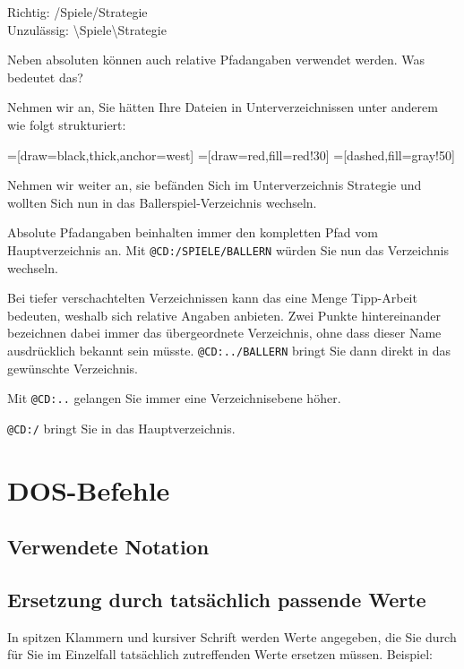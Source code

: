 \documentclass[10pt,a4paper]{scrartcl}		%
\begin{document}
Richtig: /Spiele/Strategie\\
Unzulässig: \textbackslash Spiele\textbackslash Strategie

Neben absoluten können auch relative Pfadangaben verwendet werden.
Was bedeutet das?

Nehmen wir an, Sie hätten Ihre Dateien 
in Unterverzeichnissen unter anderem wie folgt strukturiert:

=[draw=black,thick,anchor=west]
=[draw=red,fill=red!30]
=[dashed,fill=gray!50]

Nehmen wir weiter an, sie befänden Sich im Unterverzeichnis Strategie
und wollten Sich nun in das Ballerspiel-Verzeichnis wechseln.

Absolute Pfadangaben beinhalten immer den kompletten Pfad vom
Hauptverzeichnis an. Mit \texttt{@CD:/SPIELE/BALLERN} würden Sie nun
das Verzeichnis wechseln.

Bei tiefer verschachtelten Verzeichnissen kann das eine Menge Tipp-Arbeit
bedeuten, weshalb sich relative Angaben anbieten. Zwei Punkte hintereinander
bezeichnen dabei immer das übergeordnete Verzeichnis, ohne dass
dieser Name ausdrücklich bekannt sein müsste. \texttt{@CD:../BALLERN}
bringt Sie dann direkt in das gewünschte Verzeichnis.

Mit \texttt{@CD:..} gelangen Sie immer eine Verzeichnisebene höher.

\texttt{@CD:/} bringt Sie in das Hauptverzeichnis.

\section{DOS-Befehle}
\subsection{Verwendete Notation}
\subsection*{Ersetzung durch tatsächlich passende Werte}
In spitzen Klammern und kursiver Schrift werden Werte angegeben, die 
Sie durch für Sie im Einzelfall tatsächlich
zutreffenden Werte ersetzen müssen. Beispiel:
\end{document}
